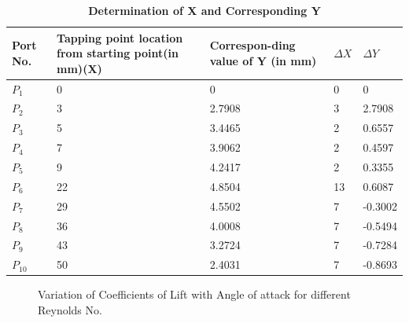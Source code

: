 \documentclass[12pt,a4paper]{article}
\begin{document}
\begin{table}[ht]
\centering
\caption{\textbf{Determination of X and Corresponding Y}}
\vspace{2mm}

\begin{tabular}{|p{10mm}|p{20mm}|p{20mm}|p{20mm}|p{20mm}|} 
 \hline
Port No. & Tapping point location from starting point(in mm)(X) & Correspon-ding 
value of Y (in mm) & $\Delta X$ &  $\Delta Y$ \\  
 \hline
$P_1$ & 0 & 0  & 0 & 0 \\ 
 \hline
$P_2$ & 3 & 2.7908 & 3 & 2.7908 \\
 \hline
$P_3$ & 5 & 3.4465 & 2 & 0.6557 \\
 \hline
 $P_4$ & 7 & 3.9062 & 2 & 0.4597 \\
 \hline
$P_5$ & 9 & 4.2417 & 2 & 0.3355\\
 \hline
$P_6$ & 22 & 4.8504 & 13 & 0.6087\\ 
 \hline
$P_7$ & 29 & 4.5502 & 7 & -0.3002 \\ 
 \hline
$P_8$ & 36 & 4.0008 & 7 & -0.5494 \\
 \hline
$P_9$ & 43 & 3.2724 & 7 & -0.7284 \\
 \hline
$P_{10}$ & 50 & 2.4031 & 7 & -0.8693 \\ 
 \hline 

\end{tabular}

\end{table}


\begin{figure}[!ht]
	\begin{center}
	\end{center}
	\caption{Variation of Coefficients of Lift with Angle of attack for different Reynolds No.}
\end{figure}
\end{document}
